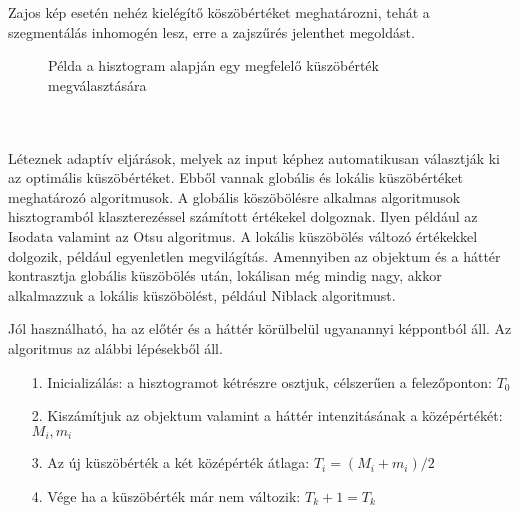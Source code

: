 Zajos kép esetén nehéz kielégítő köszöbértéket meghatározni, tehát a szegmentálás inhomogén lesz, erre a zajszűrés jelenthet megoldást.


\begin{figure}[ht]
\centering
{}
\caption{Példa a hisztogram alapján egy megfelelő küszöbérték megválasztására} 
\label{fig:threshold}
\end{figure}


\\\\
Léteznek adaptív eljárások, melyek az input képhez automatikusan választják ki az optimális küszöbértéket. Ebből vannak globális és lokális küszöbértéket meghatározó algoritmusok. A globális köszöbölésre alkalmas algoritmusok hisztogramból klaszterezéssel számított értékekel dolgoznak. Ilyen például az Isodata valamint az Otsu algoritmus. A lokális küszöbölés változó értékekkel dolgozik, például egyenletlen megvilágítás. Amennyiben az objektum és a háttér kontrasztja globális küszöbölés után, lokálisan még mindig nagy, akkor alkalmazzuk a lokális küszöbölést, például Niblack algoritmust.



Jól használható, ha az előtér és a háttér körülbelül ugyanannyi képpontból áll. Az algoritmus az alábbi lépésekből áll.
\begin{itemize}
\item[1.] Inicializálás: a hisztogramot kétrészre osztjuk, célszerűen a felezőponton: $T_0$
\item[2.] Kiszámítjuk az objektum valamint a háttér intenzitásának a középértékét: $M_i, m_i$
\item[3.] Az új küszöbérték a két középérték átlaga: $T_i=(M_i+m_i)/2$
\item[4.] Vége ha a küszöbérték már nem változik: $T_k+1=T_k$
\end{itemize}

